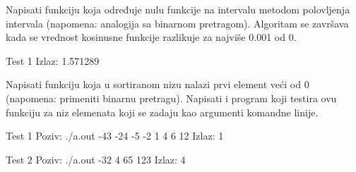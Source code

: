 \begin{Exercise}[label=405]
  Napisati funkciju koja određuje nulu funkcije  na
  intervalu \argf{[0,2]} metodom polovljenja intervala (napomena:
  analogija sa binarnom pretragom). Algoritam se završava kada se
  vrednost kosinusne funkcije razlikuje za najviše 0.001 od 0.
  
\begin{minitest}
\begin{test}{Test 1}
Izlaz:
1.571289
\end{test}
\end{minitest}
  
\end{Exercise}

\begin{Exercise}[label=406]
  Napisati funkciju koja u sortiranom nizu nalazi prvi element veći od
  0 (napomena: primeniti binarnu pretragu). Napisati i program koji
  testira ovu funkciju za niz elemenata koji se zadaju kao argumenti
  komandne linije.
  
\begin{miditest}
\begin{test}{Test 1}
Poziv:  ./a.out -43 -24 -5 -2 1 4 6 12
Izlaz:  1
\end{test}
\end{miditest}

\begin{miditest}
\begin{test}{Test 2}
Poziv:  ./a.out -32 4 65 123
Izlaz:  4
\end{test}
\end{miditest}
  
\end{Exercise}

